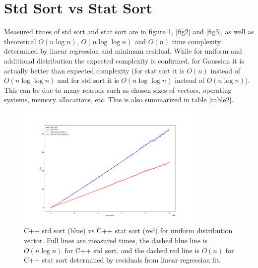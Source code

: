 \documentclass[12pt]{article}
\begin{document}
	\section{Std Sort vs Stat Sort}
	
		Measured times of std sort and stat sort are in figure \ref{fig1}, \ref{fig2} and \ref{fig3}, as well as theoretical $O(n \log n)$, $O(n \log \log n)$ and $O(n)$ time complexity determined by linear regression and minimum residual. While for uniform and additional distribution the expected complexity is confirmed, for Gaussian it is actually better than expected complexity (for stat sort it is $O(n)$ instead of $O(n \log \log n)$ and for std sort it is $O(n \log \log n)$ instead of $O(n \log n)$). This can be due to many reasons such as chosen sizes of vectors, operating systems, memory allocations, etc. This is also summarized in table \ref{table2}.

		\begin{figure}
		\begin{center}
			\includegraphics[width=0.8\textwidth]{fig_perf_uniform}
		\end{center}
			\caption{C++ std sort (blue) vs C++ stat sort (red) for uniform distribution vector. Full lines are measured times, the dashed blue line is $O(n \log n)$ for C++ std sort, and the dashed red line is $O(n)$ for C++ stat sort determined by residuals from linear regression fit.}
		
		\label{fig1}
		\end{figure}		
\end{document}
